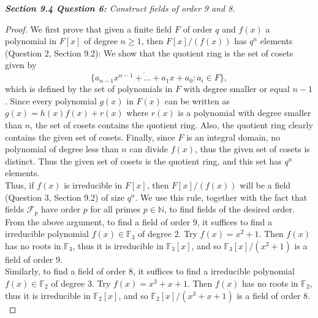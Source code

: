 \documentclass{article}
\begin{document}
\it \textbf{Section 9.4 Question 6:} Construct fields of order 9 and 8.
  \begin{proof}
    We first prove that given a finite field $F$ of order $q$ and $f(x)$ a
    polynomial in $F[x]$ of degree $n\geq1$, then $F[x]/(f(x))$ has $q^n$
    elements (Question 2, Section 9.2): We show that the quotient ring is
    the set of cosets given by
    \[\{\overline{a_{n-1}x^{n-1}+\ldots+a_1x+a_0}: a_i\in F\},\]
    which is defined by the set of polynomials in $F$ with degree smaller
    or equal $n-1$. Since every polynomial $g(x)$ in $F(x)$ can be written
    as $g(x)=h(x)f(x)+r(x)$ where $r(x)$ is a polynomial with degree
    smaller than $n$, the set of cosets contains the quotient ring. Also,
    the quotient ring clearly contains the given set of cosets. Finally,
    since $F$ is an integral domain, no polynomial of degree less than $n$
    can divide $f(x)$, thus the given set of cosets is distinct. Thus the
    given set of cosets is the quotient ring, and this set has $q^n$
    elements. \\

    Thus, if $f(x)$ is irreducible in $F[x]$, then $F[x]/(f(x))$ will be a
    field (Question 3, Section 9.2) of size $q^n$. We use this rule,
    together with the fact that fields $\mathcal{F}_p$ have order $p$ for
    all primes $p\in\mathbb{N}$, to find fields of the desired order. \\

    From the above argument, to find a field of order 9, it suffices to
    find a irreducible polynomial $f(x)\in\mathbb{F}_3$ of degree 2. Try
    $f(x)=x^2+1$. Then $f(x)$ has no roots in $\mathbb{F}_3$, thus it is
    irreducible in $\mathbb{F}_3[x]$, and so $\mathbb{F}_3[x]/(x^2+1)$ is a
    field of order 9. \\

    Similarly, to find a field of order 8, it suffices to
    find a irreducible polynomial $f(x)\in\mathbb{F}_2$ of degree 3. Try
    $f(x)=x^3+x+1$. Then $f(x)$ has no roots in $\mathbb{F}_2$, thus it is
    irreducible in $\mathbb{F}_2[x]$, and so $\mathbb{F}_2[x]/(x^3+x+1)$ is
    a field of order 8. \\
  \end{proof}
\end{document}
